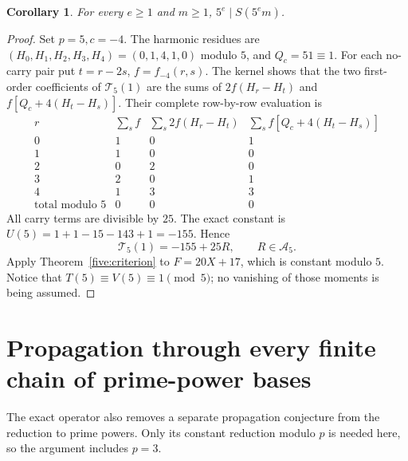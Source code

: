 \documentclass[11pt,a4paper]{article}
\newtheorem{corollary}[theorem]{Corollary}
\theoremstyle{remark}\newtheorem{remark}[theorem]{Remark}
\begin{document}
\begin{corollary}\label{five:all}
For every \(e\ge1\) and \(m\ge1\), \(\boxed{5^e\mid S(5^em)}\).
\end{corollary}
\begin{proof}
Set \(p=5,c=-4\). The harmonic residues are
\((H_0,H_1,H_2,H_3,H_4)=(0,1,4,1,0)\) modulo \(5\), and \(Q_c=51\equiv1\).
For each no-carry pair put \(t=r-2s\), \(f=f_{-4}(r,s)\).
The kernel shows that the two first-order coefficients of
\(\mathcal T_5(1)\) are the sums of
\(2f(H_r-H_t)\) and \(f[Q_c+4(H_t-H_s)]\).
Their complete row-by-row evaluation is
\[
\begin{array}{c|rrr}
 r&\sum_s f&\sum_s2f(H_r-H_t)&\sum_s f[Q_c+4(H_t-H_s)]\\ \hline
0&1&0&1\\
1&1&0&0\\
2&0&2&0\\
3&2&0&1\\
4&1&3&3\\ \hline
\text{total modulo }5&0&0&0
\end{array}
\]
All carry terms are divisible by \(25\). The exact constant is
\(U(5)=1+1-15-143+1=-155\). Hence
\[
                 \mathcal T_5(1)=-155+25R,\qquad R\in\mathcal A_5.
\]
Apply Theorem~\ref{five:criterion} to \(F=20X+17\), which is constant
modulo \(5\). Notice that \(T(5)\equiv V(5)\equiv1\pmod5\);
no vanishing of those moments is being assumed.
\end{proof}

\section{Propagation through every finite chain of prime-power bases}
\label{layer:section}

The exact operator also removes a separate propagation conjecture from
the reduction to prime powers. Only its constant reduction modulo \(p\)
is needed here, so the argument includes \(p=3\).
\end{document}
